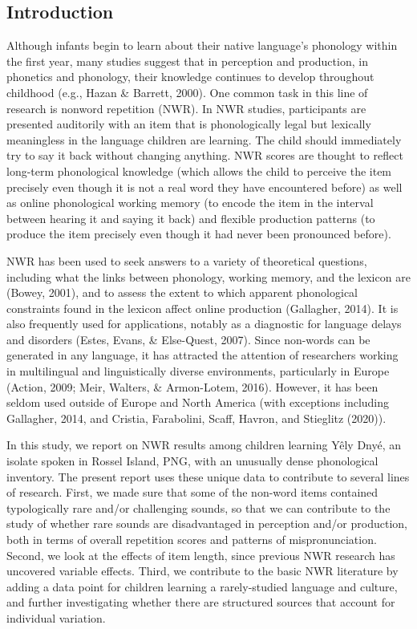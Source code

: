 \documentclass[english,,man,floatsintext]{apa6}
\begin{document}
\hypertarget{introduction}{%
\subsection{Introduction}\label{introduction}}

Although infants begin to learn about their native language's phonology within the first year, many studies suggest that in perception and production, in phonetics and phonology, their knowledge continues to develop throughout childhood (e.g., Hazan \& Barrett, 2000). One common task in this line of research is nonword repetition (NWR). In NWR studies, participants are presented auditorily with an item that is phonologically legal but lexically meaningless in the language children are learning. The child should immediately try to say it back without changing anything. NWR scores are thought to reflect long-term phonological knowledge (which allows the child to perceive the item precisely even though it is not a real word they have encountered before) as well as online phonological working memory (to encode the item in the interval between hearing it and saying it back) and flexible production patterns (to produce the item precisely even though it had never been pronounced before).

NWR has been used to seek answers to a variety of theoretical questions, including what the links between phonology, working memory, and the lexicon are (Bowey, 2001), and to assess the extent to which apparent phonological constraints found in the lexicon affect online production (Gallagher, 2014). It is also frequently used for applications, notably as a diagnostic for language delays and disorders (Estes, Evans, \& Else-Quest, 2007). Since non-words can be generated in any language, it has attracted the attention of researchers working in multilingual and linguistically diverse environments, particularly in Europe (Action, 2009; Meir, Walters, \& Armon-Lotem, 2016). However, it has been seldom used outside of Europe and North America (with exceptions including Gallagher, 2014, and Cristia, Farabolini, Scaff, Havron, and Stieglitz (2020)).

In this study, we report on NWR results among children learning Yêly Dnyé, an isolate spoken in Rossel Island, PNG, with an unusually dense phonological inventory. The present report uses these unique data to contribute to several lines of research. First, we made sure that some of the non-word items contained typologically rare and/or challenging sounds, so that we can contribute to the study of whether rare sounds are disadvantaged in perception and/or production, both in terms of overall repetition scores and patterns of mispronunciation. Second, we look at the effects of item length, since previous NWR research has uncovered variable effects. Third, we contribute to the basic NWR literature by adding a data point for children learning a rarely-studied language and culture, and further investigating whether there are structured sources that account for individual variation.
\end{document}
